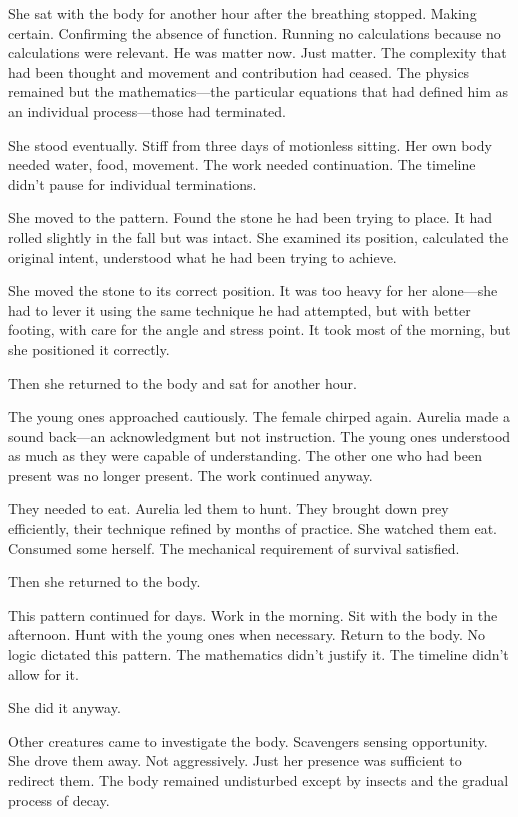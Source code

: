 She sat with the body for another hour after the breathing stopped. Making certain. Confirming the absence of function. Running no calculations because no calculations were relevant. He was matter now. Just matter. The complexity that had been thought and movement and contribution had ceased. The physics remained but the mathematics—the particular equations that had defined him as an individual process—those had terminated.

She stood eventually. Stiff from three days of motionless sitting. Her own body needed water, food, movement. The work needed continuation. The timeline didn't pause for individual terminations.

She moved to the pattern. Found the stone he had been trying to place. It had rolled slightly in the fall but was intact. She examined its position, calculated the original intent, understood what he had been trying to achieve.

She moved the stone to its correct position. It was too heavy for her alone—she had to lever it using the same technique he had attempted, but with better footing, with care for the angle and stress point. It took most of the morning, but she positioned it correctly.

Then she returned to the body and sat for another hour.

The young ones approached cautiously. The female chirped again. Aurelia made a sound back—an acknowledgment but not instruction. The young ones understood as much as they were capable of understanding. The other one who had been present was no longer present. The work continued anyway.

They needed to eat. Aurelia led them to hunt. They brought down prey efficiently, their technique refined by months of practice. She watched them eat. Consumed some herself. The mechanical requirement of survival satisfied.

Then she returned to the body.

This pattern continued for days. Work in the morning. Sit with the body in the afternoon. Hunt with the young ones when necessary. Return to the body. No logic dictated this pattern. The mathematics didn't justify it. The timeline didn't allow for it.

She did it anyway.

Other creatures came to investigate the body. Scavengers sensing opportunity. She drove them away. Not aggressively. Just her presence was sufficient to redirect them. The body remained undisturbed except by insects and the gradual process of decay.

